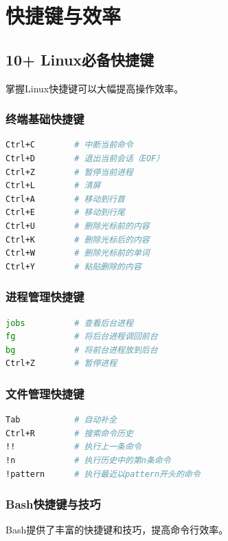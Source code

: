 \documentclass[12pt,UTF8]{ctexbook}
\begin{document}
\chapter{快捷键与效率}
\label{chap:shortcuts}

\section{10+ Linux必备快捷键}
\label{sec:linux-shortcuts}

掌握Linux快捷键可以大幅提高操作效率。

\subsection*{终端基础快捷键}
\begin{lstlisting}[language=bash]
Ctrl+C        # 中断当前命令
Ctrl+D        # 退出当前会话（EOF）
Ctrl+Z        # 暂停当前进程
Ctrl+L        # 清屏
Ctrl+A        # 移动到行首
Ctrl+E        # 移动到行尾
Ctrl+U        # 删除光标前的内容
Ctrl+K        # 删除光标后的内容
Ctrl+W        # 删除光标前的单词
Ctrl+Y        # 粘贴删除的内容
\end{lstlisting}

\subsection*{进程管理快捷键}
\begin{lstlisting}[language=bash]
jobs          # 查看后台进程
fg            # 将后台进程调回前台
bg            # 将前台进程放到后台
Ctrl+Z        # 暂停进程
\end{lstlisting}

\subsection*{文件管理快捷键}
\begin{lstlisting}[language=bash]
Tab           # 自动补全
Ctrl+R        # 搜索命令历史
!!            # 执行上一条命令
!n            # 执行历史中的第n条命令
!pattern      # 执行最近以pattern开头的命令
\end{lstlisting}

\subsection*{Bash快捷键与技巧}
\label{sec:bash-shortcuts}

Bash提供了丰富的快捷键和技巧，提高命令行效率。
\end{document}

